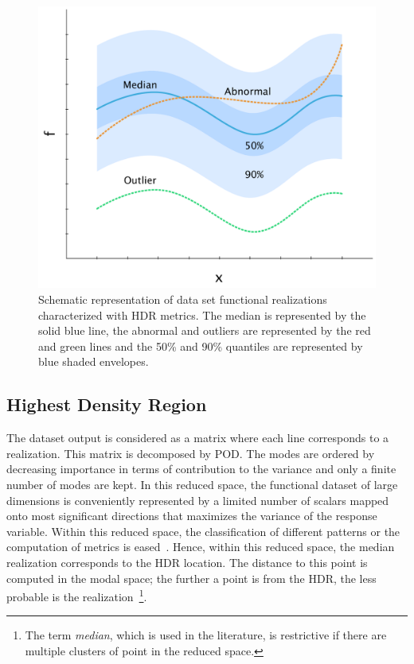 \begin{figure}[!ht]
\centering
\includegraphics[width=0.6\linewidth,keepaspectratio]{fig/literature/pattern_hdr.pdf}
\caption{Schematic representation of data set functional realizations characterized with HDR metrics. The median is represented by the solid blue line, the abnormal and outliers are represented by the red and green lines and the 50\% and 90\% quantiles are represented by blue shaded envelopes.}
\label{fig:pattern_hdr}
\end{figure}

\subsection{Highest Density Region}
\label{sec:HDR}

The dataset output is considered as a matrix where each line corresponds to a realization. This matrix is decomposed by POD. The modes are ordered by decreasing importance in terms of contribution to the variance and only a finite number of modes are kept. In this reduced space, the functional dataset of large dimensions is conveniently represented by a limited number of scalars mapped onto most significant directions that maximizes the variance of the response variable. Within this reduced space, the classification of different patterns or the computation of metrics is eased~\citep{Ren2017}. Hence, within this reduced space, the median realization corresponds to the HDR location. The distance to this point is computed in the modal space; the further a point is from the HDR, the less probable is the realization~\footnote{The term \emph{median}, which is used in the literature, is restrictive if there are multiple clusters of point in the reduced space.}.

